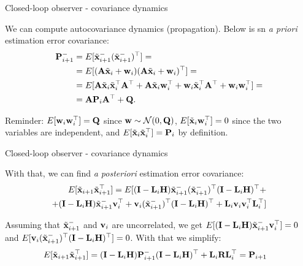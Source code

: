 \documentclass{beamer}
\newcommand{\btil}[1] {\Tilde{\mathbf{#1}}}
\begin{document}
\begin{frame}{Closed-loop observer - covariance dynamics}
	\begin{flushleft}
		
		We can compute autocovariance dynamics (propagation). Below is sn \emph{a priori} estimation error covariance:
		\begin{align*}
				\bo{P}_{i+1}^- 
				&= E[\btil{x}_{i+1}^- (\btil{x}_{i+1}^-)\T] = \\
				&= E[ (\bo{A} \btil{x}_i + \bo{w}_i) (\bo{A} \btil{x}_i + \bo{w}_i)\T] = 
				\\
				&= E[ \bo{A} \btil{x}_i \btil{x}_i\T   \bo{A}\T
				+ 
				\bo{A} \btil{x}_i \bo{w}_i\T 
				+
				\bo{w}_i\btil{x}_i \T\bo{A}\T
				+
				\bo{w}_i\bo{w}_i\T ]=\\
				&= \bo{A} \bo{P}_i \bo{A}\T +\bo{Q}.
		\end{align*}		
	
		\bigskip
	
		\textcolor{mydarkgray}{Reminder: $E[\mathbf{w}_i \mathbf{w}_i^\top] = \mathbf{Q}$ since $\mathbf{w} \sim \mathcal{N} (0, \mathbf{Q})$, $E[\btil{x}_i \bo{w}_i\T] = 0$ since the two variables are independent, and $E[\btil{x}_i \btil{x}_i\T] = \bo{P}_i$ by definition.}
		
		
	\end{flushleft}
\end{frame}





\begin{frame}{Closed-loop observer - covariance dynamics}
	\begin{flushleft}
		
		
		With that, we can find \emph{a posteriori} estimation error covariance:
		\begin{align*}
			E[\btil{x}_{i+1} \btil{x}_{i+1}\T] 
			=
			E[ (\bo{I} - \bo{L}_i \bo{H}) \btil{x}_{i+1}^- (\btil{x}_{i+1}^-)\T (\bo{I} - \bo{L}_i \bo{H})\T + \\
			+(\bo{I} - \bo{L}_i \bo{H}) \btil{x}_{i+1}^- \bo{v}_i\T +
			\bo{v}_i (\btil{x}_{i+1}^-)\T (\bo{I} - \bo{L}_i \bo{H})\T +
			\bo{L}_i \bo{v}_i \bo{v}_i\T \bo{L}_i\T]
		\end{align*}
		
		Assuming that $\btil{x}_{i+1}^-$ and $\mathbf{v}_i$ are uncorrelated, we get $E[(\bo{I} - \bo{L}_i \bo{H}) \btil{x}_{i+1}^- \bo{v}_i\T] = 0$ and $E[\bo{v}_i (\btil{x}_{i+1}^-)\T (\bo{I} - \bo{L}_i \bo{H})\T] = 0$. With that we simplify:
		\begin{align*}
			E[\btil{x}_{i+1} \btil{x}_{i+1}\T] 
			&=
			(\bo{I} - \bo{L}_i \bo{H}) \bo{P}_{i+1}^- (\bo{I} - \bo{L}_i \bo{H})\T +\bo{L}_i\bo{R}\bo{L}_i\T = \bo{P}_{i+1}
		\end{align*}
		
	\end{flushleft}
\end{frame}
\end{document}
